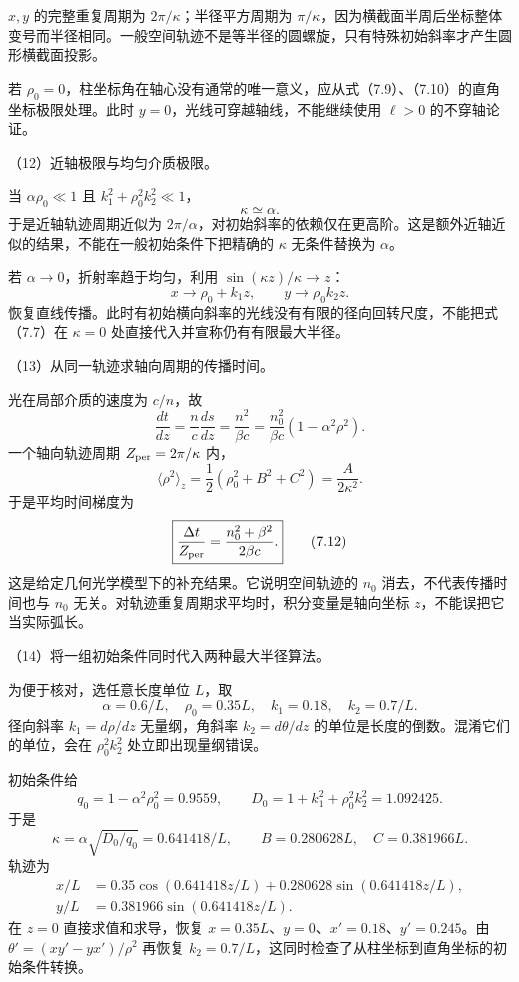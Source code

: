 \documentclass[12pt,a4paper,fontset=fandol]{ctexart}
\begin{document}
\(x,y\) 的完整重复周期为 \(2\pi/\kappa\)；半径平方周期为
\(\pi/\kappa\)，因为横截面半周后坐标整体变号而半径相同。一般空间轨迹不是等半径的圆螺旋，只有特殊初始斜率才产生圆形横截面投影。

若
\(\rho_0=0\)，柱坐标角在轴心没有通常的唯一意义，应从式（7.9）、（7.10）的直角坐标极限处理。此时
\(y=0\)，光线可穿越轴线，不能继续使用 \(\ell>0\) 的不穿轴论证。

（12）近轴极限与均匀介质极限。

当 \(\alpha\rho_0\ll1\) 且 \(k_1^2+\rho_0^2k_2^2\ll1\)， \[
\kappa\simeq\alpha.
\] 于是近轴轨迹周期近似为
\(2\pi/\alpha\)，对初始斜率的依赖仅在更高阶。这是额外近轴近似的结果，不能在一般初始条件下把精确的
\(\kappa\) 无条件替换为 \(\alpha\)。

若 \(\alpha\to0\)，折射率趋于均匀，利用 \(\sin(\kappa z)/\kappa\to z\)：
\[
x\to\rho_0+k_1z,\qquad y\to\rho_0k_2z.
\]
恢复直线传播。此时有初始横向斜率的光线没有有限的径向回转尺度，不能把式（7.7）在
\(\kappa=0\) 处直接代入并宣称仍有有限最大半径。

（13）从同一轨迹求轴向周期的传播时间。

光在局部介质的速度为 \(c/n\)，故 \[
\frac{dt}{dz}=\frac nc\frac{ds}{dz}
=\frac{n^2}{\beta c}
=\frac{n_0^2}{\beta c}(1-\alpha^2\rho^2).
\] 一个轴向轨迹周期 \(Z_{\rm per}=2\pi/\kappa\) 内， \[
\langle\rho^2\rangle_z=
\frac12(\rho_0^2+B^2+C^2)=\frac{A}{2\kappa^2}.
\] 于是平均时间梯度为 \[
\boxed{\frac{\Delta t}{Z_{\rm per}}
=\frac{n_0^2+\beta^2}{2\beta c}.}\tag{7.12}
\] 这是给定几何光学模型下的补充结果。它说明空间轨迹的 \(n_0\)
消去，不代表传播时间也与 \(n_0\)
无关。对轨迹重复周期求平均时，积分变量是轴向坐标
\(z\)，不能误把它当实际弧长。

（14）将一组初始条件同时代入两种最大半径算法。

为便于核对，选任意长度单位 \(L\)，取 \[
\alpha=0.6/L,\quad \rho_0=0.35L,\quad
k_1=0.18,\quad k_2=0.7/L.
\] 径向斜率 \(k_1=d\rho/dz\) 无量纲，角斜率 \(k_2=d\theta/dz\)
的单位是长度的倒数。混淆它们的单位，会在 \(\rho_0^2k_2^2\)
处立即出现量纲错误。

初始条件给 \[
q_0=1-\alpha^2\rho_0^2=0.9559,
\qquad D_0=1+k_1^2+\rho_0^2k_2^2=1.092425.
\] 于是 \[
\kappa=\alpha\sqrt{D_0/q_0}=0.641418/L,
\qquad B=0.280628L,\quad C=0.381966L.
\] 轨迹为 \[
\begin{aligned}
x/L&=0.35\cos(0.641418z/L)
+0.280628\sin(0.641418z/L),\\
y/L&=0.381966\sin(0.641418z/L).
\end{aligned}
\] 在 \(z=0\) 直接求值和求导，恢复
\(x=0.35L\)、\(y=0\)、\(x'=0.18\)、\(y'=0.245\)。由
\(\theta'=(xy'-yx')/\rho^2\) 再恢复
\(k_2=0.7/L\)，这同时检查了从柱坐标到直角坐标的初始条件转换。
\end{document}
